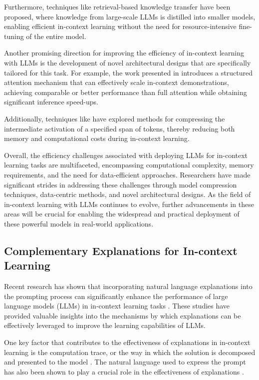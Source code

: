\documentclass[11pt]{article}
\begin{document}
Furthermore, techniques like retrieval-based knowledge transfer \cite{ref217} have been proposed, where knowledge from large-scale LLMs is distilled into smaller models, enabling efficient in-context learning without the need for resource-intensive fine-tuning of the entire model.

Another promising direction for improving the efficiency of in-context learning with LLMs is the development of novel architectural designs that are specifically tailored for this task. For example, the work presented in \cite{ref218} introduces a structured attention mechanism that can effectively scale in-context demonstrations, achieving comparable or better performance than full attention while obtaining significant inference speed-ups.

Additionally, techniques like \cite{ref219} have explored methods for compressing the intermediate activation of a specified span of tokens, thereby reducing both memory and computational costs during in-context learning.

Overall, the efficiency challenges associated with deploying LLMs for in-context learning tasks are multifaceted, encompassing computational complexity, memory requirements, and the need for data-efficient approaches. Researchers have made significant strides in addressing these challenges through model compression techniques, data-centric methods, and novel architectural designs. As the field of in-context learning with LLMs continues to evolve, further advancements in these areas will be crucial for enabling the widespread and practical deployment of these powerful models in real-world applications.

\subsection{Complementary Explanations for In-context Learning}

Recent research has shown that incorporating natural language explanations into the prompting process can significantly enhance the performance of large language models (LLMs) in in-context learning tasks \cite{ref196,ref220}. These studies have provided valuable insights into the mechanisms by which explanations can be effectively leveraged to improve the learning capabilities of LLMs.

One key factor that contributes to the effectiveness of explanations in in-context learning is the computation trace, or the way in which the solution is decomposed and presented to the model \cite{ref196}. The natural language used to express the prompt has also been shown to play a crucial role in the effectiveness of explanations \cite{ref220}.
\end{document}
